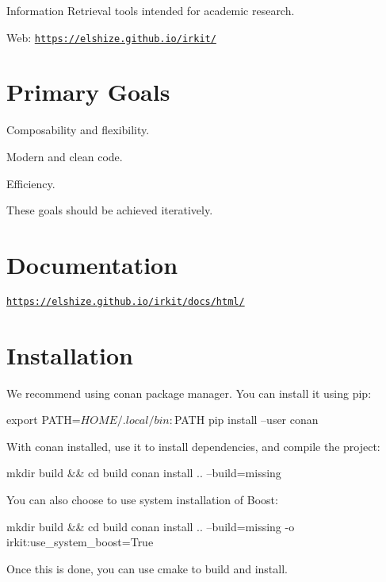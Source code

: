 Information Retrieval tools intended for academic research.

Web\+: \href{https://elshize.github.io/irkit/}{\tt https\+://elshize.\+github.\+io/irkit/}

\section*{Primary Goals}


\begin{DoxyEnumerate}
\item Composability and flexibility.
\item Modern and clean code.
\item Efficiency.
\end{DoxyEnumerate}

These goals should be achieved iteratively.

\section*{Documentation}

\href{https://elshize.github.io/irkit/docs/html/}{\tt https\+://elshize.\+github.\+io/irkit/docs/html/}

\section*{Installation}

We recommend using {\ttfamily conan} package manager. You can install it using {\ttfamily pip}\+:


\begin{DoxyCode}
export PATH=$HOME/.local/bin:$PATH
pip install --user conan
\end{DoxyCode}


With {\ttfamily conan} installed, use it to install dependencies, and compile the project\+:


\begin{DoxyCode}
mkdir build && cd build
conan install .. --build=missing
\end{DoxyCode}


You can also choose to use system installation of Boost\+:


\begin{DoxyCode}
mkdir build && cd build
conan install .. --build=missing -o irkit:use\_system\_boost=True
\end{DoxyCode}


Once this is done, you can use {\ttfamily cmake} to build and install.


